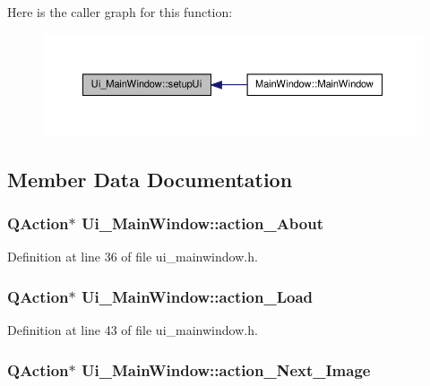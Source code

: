 Here is the caller graph for this function:
\nopagebreak
\begin{figure}[H]
\begin{center}
\leavevmode
\includegraphics[width=380pt]{classUi__MainWindow_acf4a0872c4c77d8f43a2ec66ed849b58_icgraph}
\end{center}
\end{figure}




\subsection{Member Data Documentation}
\hypertarget{classUi__MainWindow_ac2669cdd6ec6085dbd477c3636ddab29}{
\subsubsection[{action\_\-About}]{\setlength{\rightskip}{0pt plus 5cm}QAction$\ast$ {\bf Ui\_\-MainWindow::action\_\-About}}}
\label{classUi__MainWindow_ac2669cdd6ec6085dbd477c3636ddab29}


Definition at line 36 of file ui\_\-mainwindow.h.

\hypertarget{classUi__MainWindow_a738e92d19d3efa6a6c8c7054f23fbd26}{
\subsubsection[{action\_\-Load}]{\setlength{\rightskip}{0pt plus 5cm}QAction$\ast$ {\bf Ui\_\-MainWindow::action\_\-Load}}}
\label{classUi__MainWindow_a738e92d19d3efa6a6c8c7054f23fbd26}


Definition at line 43 of file ui\_\-mainwindow.h.

\hypertarget{classUi__MainWindow_ae13b44517a6ac27b75f9068fedaf43b3}{
\subsubsection[{action\_\-Next\_\-Image}]{\setlength{\rightskip}{0pt plus 5cm}QAction$\ast$ {\bf Ui\_\-MainWindow::action\_\-Next\_\-Image}}}
\label{classUi__MainWindow_ae13b44517a6ac27b75f9068fedaf43b3}


